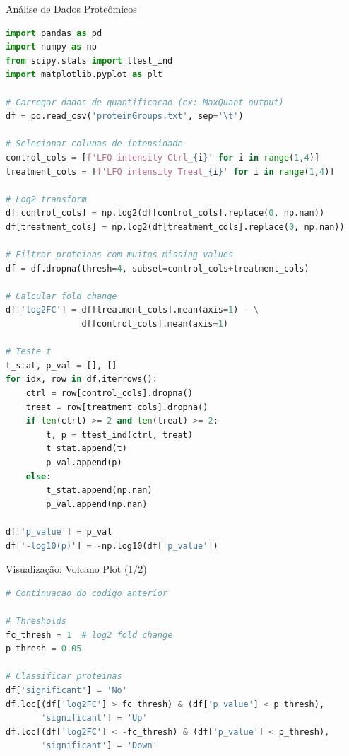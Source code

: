 \begin{frame}[fragile, shrink=20]{Análise de Dados Proteômicos}
\begin{lstlisting}[language=Python, caption=Processamento de dados MS, basicstyle=\ttfamily\tiny]
import pandas as pd
import numpy as np
from scipy.stats import ttest_ind
import matplotlib.pyplot as plt

# Carregar dados de quantificacao (ex: MaxQuant output)
df = pd.read_csv('proteinGroups.txt', sep='\t')

# Selecionar colunas de intensidade
control_cols = [f'LFQ intensity Ctrl_{i}' for i in range(1,4)]
treatment_cols = [f'LFQ intensity Treat_{i}' for i in range(1,4)]

# Log2 transform
df[control_cols] = np.log2(df[control_cols].replace(0, np.nan))
df[treatment_cols] = np.log2(df[treatment_cols].replace(0, np.nan))

# Filtrar proteinas com muitos missing values
df = df.dropna(thresh=4, subset=control_cols+treatment_cols)

# Calcular fold change
df['log2FC'] = df[treatment_cols].mean(axis=1) - \
               df[control_cols].mean(axis=1)

# Teste t
t_stat, p_val = [], []
for idx, row in df.iterrows():
    ctrl = row[control_cols].dropna()
    treat = row[treatment_cols].dropna()
    if len(ctrl) >= 2 and len(treat) >= 2:
        t, p = ttest_ind(ctrl, treat)
        t_stat.append(t)
        p_val.append(p)
    else:
        t_stat.append(np.nan)
        p_val.append(np.nan)

df['p_value'] = p_val
df['-log10(p)'] = -np.log10(df['p_value'])
\end{lstlisting}
\end{frame}

\begin{frame}[fragile, shrink=15]{Visualização: Volcano Plot (1/2)}
\begin{lstlisting}[language=Python, caption=Volcano plot proteômico, basicstyle=\ttfamily\tiny]
# Continuacao do codigo anterior

# Thresholds
fc_thresh = 1  # log2 fold change
p_thresh = 0.05

# Classificar proteinas
df['significant'] = 'No'
df.loc[(df['log2FC'] > fc_thresh) & (df['p_value'] < p_thresh),
       'significant'] = 'Up'
df.loc[(df['log2FC'] < -fc_thresh) & (df['p_value'] < p_thresh),
       'significant'] = 'Down'

\end{lstlisting}
\end{frame}

